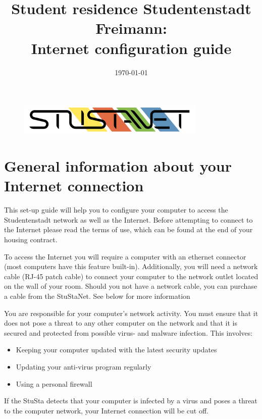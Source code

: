 \documentclass[a4paper,12pt]{scrartcl}
\title{Student residence Studentenstadt Freimann:\\
       Internet configuration guide}
\date{\today}
\begin{document}
\maketitle

\begin{figure}[t!]
   \centering
   \vspace{-20pt}
   \includegraphics[width=0.8\textwidth,keepaspectratio]{Bilder/StuStaNet_Logo}
   \vspace{-20pt}
\end{figure}

\section*{General information about your Internet connection}

This set-up guide will help you to configure your computer to access the Studentenstadt network as well as the Internet. Before attempting to connect to the Internet please read the terms of use, which can be found at the end of your housing contract.

To access the Internet you will require a computer with an ethernet connector (most computers have this feature built-in). Additionally, you will need a network cable (RJ-45 patch cable) to connect your computer to the network outlet located on the wall of your room. Should you not have a network cable, you can purchase a cable from the StuStaNet. See below for more information

You are responsible for your computer's network activity. You must ensure that it does not pose a threat to any other computer on the network and that it is secured and protected from possible virus- and malware infection. This involves:
\begin{itemize}
    \item Keeping your computer updated with the latest security updates
    \item Updating your anti-virus program regularly
    \item Using a personal firewall
\end{itemize}
If the StuSta detects that your computer is infected by a virus and poses a threat to the computer network, your Internet connection will be cut off.
\end{document}
